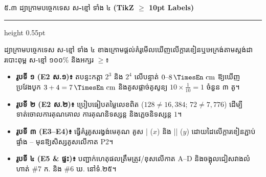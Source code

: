 \documentclass[a4paper,12pt]{article}
\newcommand{\en}[1]{{\TimesEn #1}}
\newcommand{\enbf}[1]{{\TimesEn\textbf{#1}}}
\newcommand{\unit}[1]{\,\text{\en{#1}}}
\newcommand{\cnum}[1]{{\TimesEn\fontsize{10.5pt}{12pt}\selectfont\ding{\numexpr181+#1\relax}}}
\newcommand{\subsectitle}[1]{{\muol\fontsize{11.5pt}{18.5pt}\selectfont #1}}
\newcommand{\subsec}[1]{%
  \Needspace{1.7cm}%
  \vspace{3pt}%
  \subsectitle{#1}\par%
  \vspace{-2pt}%
  {\color{black}\hrule height 0.55pt}%
  \vspace{3pt}%
}
\begin{document}
\subsec{៥\enbf{.}៣ ដ្យាក្រាមបច្ចេកទេស ស\enbf{-}ខ្មៅ ទាំង ៤ \enbf{(TikZ $\ge$ 10pt Labels)}}

ដ្យាក្រាមបច្ចេកទេស ស-ខ្មៅ ទាំង ៤ ខាងក្រោមផ្ដល់គំរូមើលឃើញលើក្ដារខៀនឬអេក្រង់តាមស្តង់ដារបោះពុម្ព ស-ខ្មៅ ១០០\% និងអក្សរ $\ge$\en{10pt}៖
\begin{itemize}[leftmargin=0.65cm, itemsep=1.5pt, topsep=3pt]
  \item \textbf{រូបទី ១ (\en{E2} ស.១)៖} តបន្ទះកត្តា $2^3$ និង $2^4$ លើបន្ទាត់ $0\text{--}8\unit{cm}$ ឱ្យឃើញប្រវែងបូក $3+4=7\unit{cm}$ និងគូសផ្ដាច់គូសូន្យ $10\times\frac{1}{10}=1$ ចំនួន ៣ គូ។
  \item \textbf{រូបទី ២ (\en{E2} ស.២)៖} ប្រៀបធៀបតម្លៃលេខពិត ($128\neq 16,384$; $72\neq 7,776$) ដើម្បីទាត់ចោលការគុណគោល ការគុណនិទស្សន្ត និងភ្លេចនិទស្សន្ត $1$។
  \item \textbf{រូបទី ៣ (\en{E3--E4})៖} ធ្វើគំរូគូសរង្វង់មេគុណ គូស \en{|} ($x$) និង \en{||} ($y$) ដោយដៃលើក្ដារខៀនភ្ជាប់ផ្ទាំង \cnum{1}--\cnum{5} មុនឱ្យសិស្សគូសលើកាត \en{P2}។
  \item \textbf{រូបទី ៤ (\en{E5} \& ផ្ទះ)៖} បញ្ជាក់ហេតុផលត្រឹមត្រូវ/ខុសលើកាត \en{A--D} និងចង្អុលជៀសវាងលំហាត់ \en{\#7} ក. និង \en{\#6} ឃ. នៅទំ.២៥។
\end{itemize}
\end{document}
